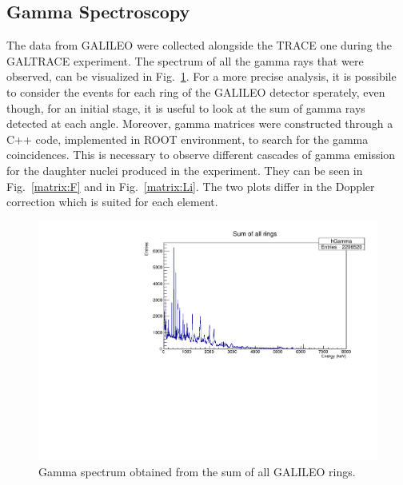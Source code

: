 \subsection{Gamma Spectroscopy}\label{gammaspectr}

The data from GALILEO were collected alongside the TRACE one during the
GALTRACE experiment. The spectrum of all the gamma rays that were observed,
can be visualized in Fig.~\ref{gamma}.
For a more precise analysis, it is possibile to consider the events for each
ring of the GALILEO detector sperately, even though, for an initial stage,
it is useful to look at the sum of gamma rays detected at each angle.
Moreover, gamma matrices were constructed through a C++ code,
implemented in ROOT environment, to search for the gamma coincidences.
This is necessary to observe different cascades of gamma emission for the
daughter nuclei produced in the experiment.
They can be seen in Fig.~\ref{matrix:F} and in Fig.~\ref{matrix:Li}.
The two plots differ in the Doppler correction which is suited for each element.

\begin{figure}[h]
  \centering
  \includegraphics[scale=.6]{img/gamma.pdf}
  \caption{Gamma spectrum obtained from the sum of all GALILEO rings.}
  \label{gamma}
\end{figure}

